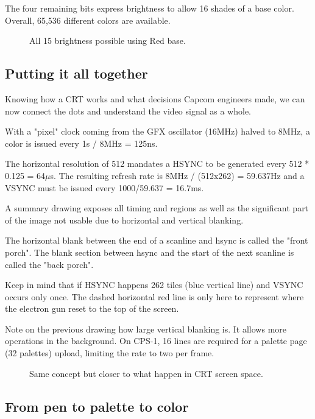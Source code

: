The four remaining bits express brightness to allow 16 shades of a base color. Overall, 65,536 different colors are available.

\begin{figure}[H]
\caption*{All 15 brightness possible using Red  base.}
\end{figure}

\subsection{Putting it all together}

Knowing how a CRT works and what decisions Capcom engineers made, we can now connect the dots and understand the video signal as a whole.

With a "pixel" clock coming from the GFX oscillator (16MHz) halved to 8MHz, a color is issued every 1s / 8MHz = 125ns.

The horizontal resolution of 512 mandates a HSYNC to be generated every 512 * 0.125 = 64$\mu$s. The resulting refresh rate is 8MHz / (512x262) = 59.637Hz and a VSYNC must be issued every 1000/59.637 = 16.7ms.

A summary drawing exposes all timing and regions as well as the significant part of the image not usable due to horizontal and vertical blanking.

\begin{trivia}
The horizontal blank between the end of a scanline and hsync is called the "front porch". The blank section between hsync and the start of the next scanline is called the "back porch".
\end{trivia}


Keep in mind that if HSYNC happens 262 tiles (blue vertical line) and VSYNC occurs only once. The dashed horizontal red line is only here to represent where the electron gun reset to the top of the screen.

Note on the previous drawing how large vertical blanking is. It allows more operations in the background. On CPS-1, 16 lines are required for a palette page (32 palettes) upload, limiting the rate to two per frame.

\begin{figure}[H]
\caption*{Same concept but closer to what happen in CRT screen space.}
\end{figure}


\subsection{From pen to palette to color}

